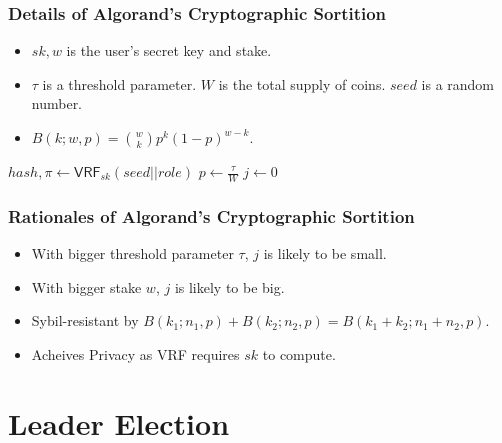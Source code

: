 \documentclass{beamer}
\begin{document}
\begin{frame}
\frametitle{Details of Algorand's Cryptographic Sortition}

\begin{itemize}
    \item $sk, w$ is the user's secret key and stake.
    \item $\tau$ is a threshold parameter. $W$ is the total supply of coins. $seed$ is a random number.
    \item $B(k; w, p) = {w \choose k} p^k (1-p)^{w-k}$.
\end{itemize}

\begin{algorithm}[H]
    \DontPrintSemicolon
    $hash, \pi \gets \mathsf{VRF}_{sk}(seed || role)$\;
    $p \gets \frac{\tau}{W}$\;
    $j \gets 0$\;
    \While{$\frac{hash}{2^{hashlen}} \notin \left[ \sum_{k=0}^j B(k;w,p), \sum_{k=0}^{j+1} B(k;w,p) \right)$}{
        $j++$\;
    }
    \caption{$\mathsf{Sortition}(sk, seed, \tau, role, w, W)$}
\end{algorithm}

\end{frame}

\begin{frame}
\frametitle{Rationales of Algorand's Cryptographic Sortition}
    
\begin{itemize}
    \item With bigger threshold parameter $\tau$, $j$ is likely to be small.
    \item With bigger stake $w$, $j$ is likely to be big.
    \item Sybil-resistant by $B(k_1;n_1,p) + B(k_2;n_2,p) = B(k_1 + k_2;n_1 + n_2,p)$.
    \item Acheives Privacy as VRF requires $sk$ to compute.
\end{itemize}

\end{frame}





\section{Leader Election}
\end{document}
